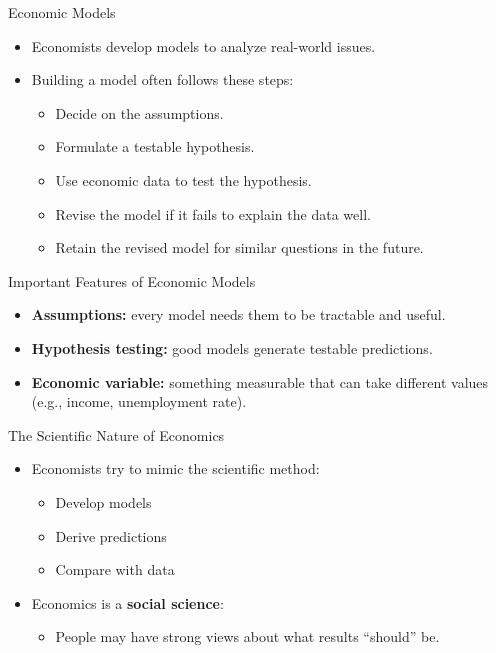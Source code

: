 \documentclass[aspectratio=169]{beamer}
\begin{document}
\begin{frame}{Economic Models}
\transfade
\begin{itemize}
  \item Economists develop models to analyze real-world issues.
  \item Building a model often follows these steps:
  \begin{itemize}
    \item Decide on the assumptions.
    \item Formulate a testable hypothesis.
    \item Use economic data to test the hypothesis.
    \item Revise the model if it fails to explain the data well.
    \item Retain the revised model for similar questions in the future.
  \end{itemize}
\end{itemize}
\end{frame}

\begin{frame}{Important Features of Economic Models}
\transfade
\begin{itemize}
  \item \textbf{Assumptions:} every model needs them to be tractable and useful.
  \item \textbf{Hypothesis testing:} good models generate testable predictions.
  \item \textbf{Economic variable:} something measurable that can take different values (e.g., income, unemployment rate).
\end{itemize}
\end{frame}

\begin{frame}{The Scientific Nature of Economics}
\transfade
\begin{itemize}
  \item Economists try to mimic the scientific method:
  \begin{itemize}
    \item Develop models
    \item Derive predictions
    \item Compare with data
  \end{itemize}
  \item Economics is a \textbf{social science}:
  \begin{itemize}
    \item People may have strong views about what results ``should'' be.
  \end{itemize}
\end{itemize}
\end{frame}
\end{document}
